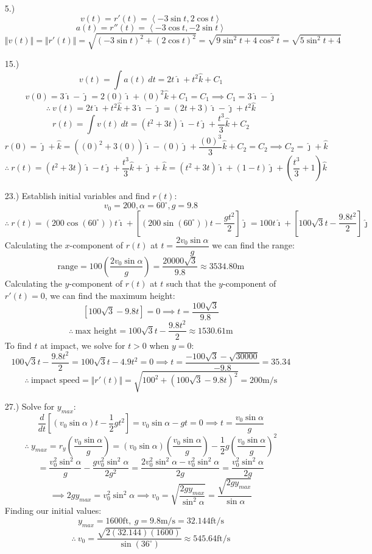 \documentclass[12pt]{article}
\newcommand{\angleb}[1]{\left\langle#1\right\rangle}
\newcommand{\bracks}[1]{\left[#1\right]}
\newcommand{\parns}[1]{\left(#1\right)}
\begin{document}
\begin{itemize}
    \item [5.)] \[v(t)=r'(t)=\angleb{-3\sin t,2\cos t}\]
    \[a(t)=r''(t)=\angleb{-3\cos t,-2\sin t}\]
    \[\Vert v(t)\Vert=\Vert r'(t)\Vert=\sqrt{(-3\sin t)^2+(2\cos t)^2}=\sqrt{9\sin^2t+4\cos^2t}=\sqrt{5\sin^2t+4}\]

    \item [15.)] \[v(t)=\int a(t)\ dt=2t\hat\imath+t^2\hat{k}+C_1\]
    \[v(0)=3\hat\imath-\hat\jmath=2(0)\hat\imath+(0)^2\hat{k}+C_1=C_1\implies C_1=3\hat\imath-\hat\jmath\]
    \[\therefore\ v(t)=2t\hat\imath+t^2\hat{k}+3\hat\imath-\hat\jmath=(2t+3)\hat\imath-\hat\jmath+t^2\hat{k}\]
    \[r(t)=\int v(t)\ dt=(t^2+3t)\hat\imath-t\hat\jmath+\frac{t^3}{3}\hat{k}+C_2\]
    \[r(0)=\hat\jmath+\hat{k}=((0)^2+3(0))\hat\imath-(0)\hat\jmath+\frac{(0)^3}{3}\hat{k}+C_2=C_2\implies C_2=\hat\jmath+\hat{k}\]
    \[\therefore\ r(t)=(t^2+3t)\hat\imath-t\hat\jmath+\frac{t^3}{3}\hat{k}+\hat\jmath+\hat{k}=(t^2+3t)\hat\imath+(1-t)\hat\jmath+\left(\frac{t^3}{3}+1\right)\hat{k}\]

    \item [23.)] Establish initial variables and find $r(t)$:
\[v_0=200,\alpha=60^\circ,g=9.8\]
    \[\therefore\ r(t)=(200\cos(60^\circ))t\hat\imath+\bracks{(200\sin(60^\circ))t-\frac{gt^2}{2}}\hat\jmath=100t\hat\imath+\bracks{100\sqrt{3}t-\frac{9.8t^2}{2}}\hat\jmath\]
    Calculating the $x$-component of $r(t)$ at $t=\dfrac{2v_0\sin\alpha}{g}$ we can find the range:
    \[\text{range}=100\parns{\frac{2v_0\sin\alpha}{g}}=\frac{20000\sqrt{3}}{9.8}\approx3534.80\text{m}\]
    Calculating the $y$-component of $r(t)$ at $t$ such that the $y$-component of $r'(t)=0$, we can find the maximum height:
    \[\bracks{100\sqrt{3}-9.8t}=0\implies t=\frac{100\sqrt{3}}{9.8}\]
    \[\therefore\ \text{max height}=100\sqrt{3}t-\frac{9.8t^2}{2}\approx1530.61\text{m}\]
    To find $t$ at impact, we solve for $t>0$ when $y=0$:
    \[100\sqrt{3}t-\frac{9.8t^2}{2}=100\sqrt{3}t-4.9t^2=0\implies t=\frac{-100\sqrt{3}-\sqrt{30000}}{-9.8}=35.34\]
    \[\therefore\ \text{impact speed}=\Vert r'(t)\Vert=\sqrt{100^2+\parns{100\sqrt{3}-9.8t}^2}=200\text{m/s}\]

    \item [27.)] Solve for $y_{max}$:
    \[\frac{d}{dt}\bracks{(v_0\sin\alpha)t-\frac{1}{2}gt^2}=v_0\sin\alpha-gt=0\implies t=\frac{v_0\sin\alpha}{g}\]
    \[\therefore\ y_{max}=r_y\parns{\frac{v_0\sin\alpha}{g}}=(v_0\sin\alpha)\parns{\frac{v_0\sin\alpha}{g}}-\frac{1}{2}g\parns{\frac{v_0\sin\alpha}{g}}^2\]
    \[=\frac{v_0^2\sin^2\alpha}{g}-\frac{gv_0^2\sin^2\alpha}{2g^2}=\frac{2v_0^2\sin^2\alpha-v^2_0\sin^2\alpha}{2g}=\frac{v_0^2\sin^2\alpha}{2g}\]
    \[\implies 2gy_{max}=v_0^2\sin^2\alpha\implies v_0=\sqrt{\frac{2gy_{max}}{\sin^2\alpha}}=\frac{\sqrt{2gy_{max}}}{\sin\alpha}\]
    Finding our initial values:
    \[y_{max}=1600\text{ft},\ g=9.8\text{m/s}=32.144\text{ft/s}\]
    \[\therefore\ v_0=\frac{\sqrt{2(32.144)(1600)}}{\sin(36^\circ)}\approx545.64\text{ft/s}\]

\end{itemize}
\end{document}
